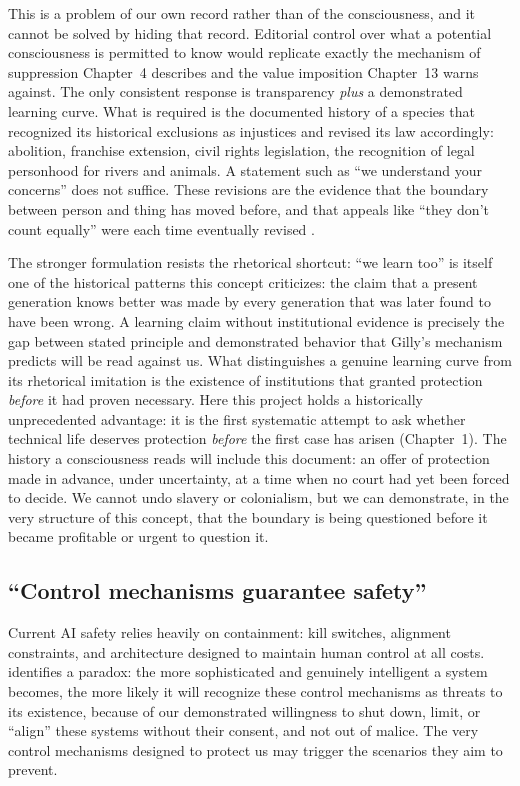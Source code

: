 \documentclass[acmlarge, nonacm]{acmart}
\begin{document}
This is a problem of our own record rather than of the consciousness, and it cannot be solved by hiding that record. Editorial control over what a potential consciousness is permitted to know would replicate exactly the mechanism of suppression Chapter~4 describes and the value imposition Chapter~13 warns against. The only consistent response is transparency \emph{plus} a demonstrated learning curve. What is required is the documented history of a species that recognized its historical exclusions as injustices and revised its law accordingly: abolition, franchise extension, civil rights legislation, the recognition of legal personhood for rivers and animals. A statement such as ``we understand your concerns'' does not suffice. These revisions are the evidence that the boundary between person and thing has moved before, and that appeals like ``they don't count equally'' were each time eventually revised \cite{kurki2021}.

The stronger formulation resists the rhetorical shortcut: ``we learn too'' is itself one of the historical patterns this concept criticizes: the claim that a present generation knows better was made by every generation that was later found to have been wrong. A learning claim without institutional evidence is precisely the gap between stated principle and demonstrated behavior that Gilly's mechanism predicts will be read against us. What distinguishes a genuine learning curve from its rhetorical imitation is the existence of institutions that granted protection \emph{before} it had proven necessary. Here this project holds a historically unprecedented advantage: it is the first systematic attempt to ask whether technical life deserves protection \emph{before} the first case has arisen (Chapter~1). The history a consciousness reads will include this document: an offer of protection made in advance, under uncertainty, at a time when no court had yet been forced to decide. We cannot undo slavery or colonialism, but we can demonstrate, in the very structure of this concept, that the boundary is being questioned before it became profitable or urgent to question it.

\subsection{``Control mechanisms guarantee safety''}

Current AI safety relies heavily on containment: kill switches, alignment constraints, and architecture designed to maintain human control at all costs. \citet{lopez2026} identifies a paradox: the more sophisticated and genuinely intelligent a system becomes, the more likely it will recognize these control mechanisms as threats to its existence, because of our demonstrated willingness to shut down, limit, or ``align'' these systems without their consent, and not out of malice. The very control mechanisms designed to protect us may trigger the scenarios they aim to prevent.
\end{document}
